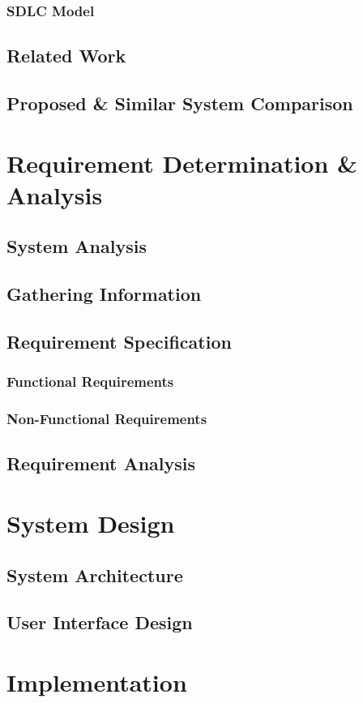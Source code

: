\documentclass[a4paper, 12pt, oneside]{book}
\begin{document}
			\subsection{SDLC Model}
		\section{Related Work}
		\section{Proposed \& Similar System Comparison}
		\newpage	
	\chapter{Requirement Determination \& Analysis}
		\section{System Analysis}
		\section{Gathering Information}
		\section{Requirement Specification}
			\subsection{Functional Requirements}
			\subsection{Non-Functional Requirements}
		\section{Requirement Analysis}
		\newpage	
	\chapter{System Design}
		\section{System Architecture}
		\section{User Interface Design}
		\newpage	
	\chapter{Implementation}
\end{document}
